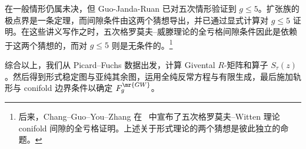 \begin{rmk}
     在一般情形仍属未决，但 Guo-Janda-Ruan 已对五次情形验证到 \(g \leq 5\)。扩张族的极点界是一条定理，而间隙条件由这两个猜想导出，并已通过显式计算对 \(g \leq 5\) 证明。在这些讲义写作之时，五次格罗莫夫–威滕理论的全亏格间隙条件因此是依赖于这两个猜想的，而对 \(g \leq 5\) 则是无条件的。\footnote{后来，Chang--Guo--You--Zhang 在~\cite{CGYZ2026} 中宣布了五次格罗莫夫--Witten 理论 conifold 间隙的全亏格证明。上述关于形式理论的两个猜想是彼此独立的命题。}
\end{rmk}

综合以上，我们从 Picard--Fuchs 数据出发，计算 Givental \(R\)-矩阵和算子 \(S_{\tau}(z)\)。然后得到形式稳定图与亚纯其余图，运用全纯反常方程与有限生成，最后施加轨形与 conifold 边界条件以确定 \(F_g^{\mr{GW}}\)。

